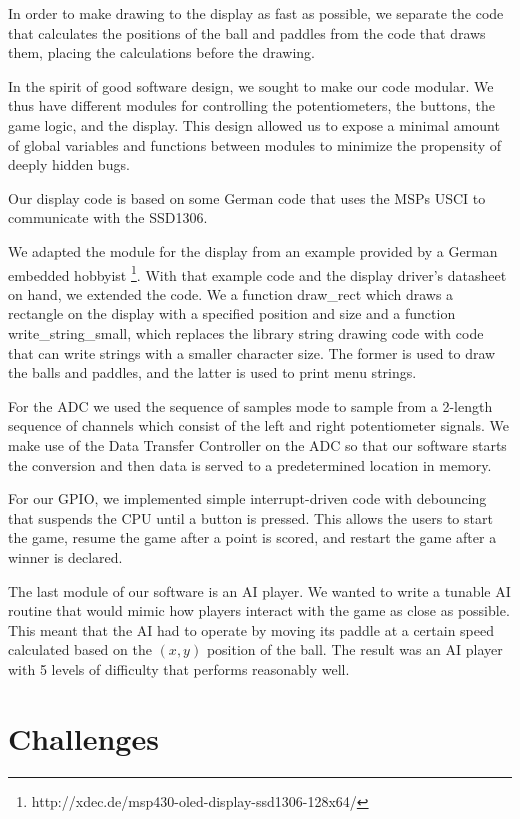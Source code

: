 \documentclass{article}
\begin{document}
In order to make drawing to the display as fast as possible, we separate the code that calculates the positions of the ball
and paddles from the code that draws them, placing the calculations before the drawing.

In the spirit of good software design, we sought to make our code modular. We thus have different modules for controlling the potentiometers, the buttons, the game logic, and the display. This design allowed us to expose a minimal amount of global variables and functions between modules to minimize the propensity of deeply hidden bugs. 

Our display code is based on some German code that uses the MSPs USCI to communicate with the SSD1306.

We adapted the module for the display from an example provided by a German embedded hobbyist \footnote{http://xdec.de/msp430-oled-display-ssd1306-128x64/}. With that example code and the display driver's datasheet on hand, we extended the code. We a function draw\_rect which draws a rectangle on the display with a specified position and size and
a function write\_string\_small, which replaces the library string drawing code with code that can write strings with a smaller
character size. The former is used to draw the balls and paddles, and the latter is used to print menu strings.

For the ADC we used the sequence of samples mode to sample from a 2-length sequence of channels which consist of the left and right potentiometer signals. We make use of the Data Transfer Controller on the ADC so that our software starts the conversion and then data is served to a predetermined location in memory. 

For our GPIO, we implemented simple interrupt-driven code with debouncing that suspends the CPU until a button is pressed. This allows the users to start the game, resume the game after a point is scored, and restart the game after a winner is declared.

The last module of our software is an AI player. We wanted to write a tunable AI routine that would mimic how players interact with the game as close as possible. This meant that the AI had to operate by moving its paddle at a certain speed calculated based on the $(x,y)$ position of the ball. The result was an AI player with 5 levels of difficulty that performs reasonably well.

\section{Challenges}
\end{document}
